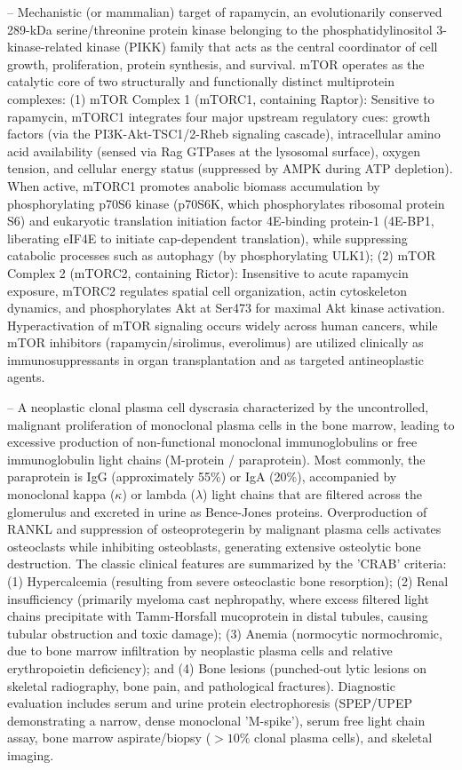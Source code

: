 -- Mechanistic (or mammalian) target of rapamycin, an evolutionarily conserved 289-kDa serine/threonine protein kinase belonging to the phosphatidylinositol 3-kinase-related kinase (PIKK) family that acts as the central coordinator of cell growth, proliferation, protein synthesis, and survival. mTOR operates as the catalytic core of two structurally and functionally distinct multiprotein complexes: (1) mTOR Complex 1 (mTORC1, containing Raptor): Sensitive to rapamycin, mTORC1 integrates four major upstream regulatory cues: growth factors (via the PI3K-Akt-TSC1/2-Rheb signaling cascade), intracellular amino acid availability (sensed via Rag GTPases at the lysosomal surface), oxygen tension, and cellular energy status (suppressed by AMPK during ATP depletion). When active, mTORC1 promotes anabolic biomass accumulation by phosphorylating p70S6 kinase (p70S6K, which phosphorylates ribosomal protein S6) and eukaryotic translation initiation factor 4E-binding protein-1 (4E-BP1, liberating eIF4E to initiate cap-dependent translation), while suppressing catabolic processes such as autophagy (by phosphorylating ULK1); (2) mTOR Complex 2 (mTORC2, containing Rictor): Insensitive to acute rapamycin exposure, mTORC2 regulates spatial cell organization, actin cytoskeleton dynamics, and phosphorylates Akt at Ser473 for maximal Akt kinase activation. Hyperactivation of mTOR signaling occurs widely across human cancers, while mTOR inhibitors (rapamycin/sirolimus, everolimus) are utilized clinically as immunosuppressants in organ transplantation and as targeted antineoplastic agents.

-- A neoplastic clonal plasma cell dyscrasia characterized by the uncontrolled, malignant proliferation of monoclonal plasma cells in the bone marrow, leading to excessive production of non-functional monoclonal immunoglobulins or free immunoglobulin light chains (M-protein / paraprotein). Most commonly, the paraprotein is IgG (approximately 55\%) or IgA (20\%), accompanied by monoclonal kappa ($\kappa$) or lambda ($\lambda$) light chains that are filtered across the glomerulus and excreted in urine as Bence-Jones proteins. Overproduction of RANKL and suppression of osteoprotegerin by malignant plasma cells activates osteoclasts while inhibiting osteoblasts, generating extensive osteolytic bone destruction. The classic clinical features are summarized by the 'CRAB' criteria: (1) Hypercalcemia (resulting from severe osteoclastic bone resorption); (2) Renal insufficiency (primarily myeloma cast nephropathy, where excess filtered light chains precipitate with Tamm-Horsfall mucoprotein in distal tubules, causing tubular obstruction and toxic damage); (3) Anemia (normocytic normochromic, due to bone marrow infiltration by neoplastic plasma cells and relative erythropoietin deficiency); and (4) Bone lesions (punched-out lytic lesions on skeletal radiography, bone pain, and pathological fractures). Diagnostic evaluation includes serum and urine protein electrophoresis (SPEP/UPEP demonstrating a narrow, dense monoclonal 'M-spike'), serum free light chain assay, bone marrow aspirate/biopsy ($>10\%$ clonal plasma cells), and skeletal imaging.

